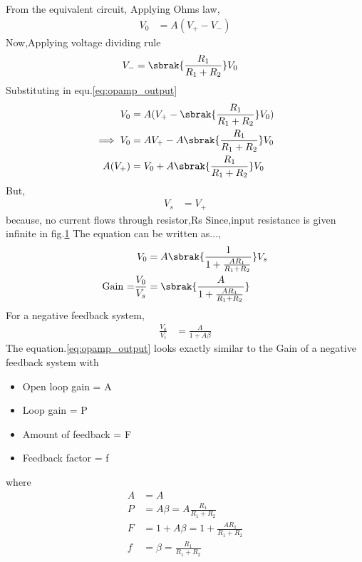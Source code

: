 \begin{enumerate}[label=\thesubsection.\arabic*.,ref=\thesubsection.\theenumi]
\begin{figure}[!ht]
\begin{center}
		\resizebox{\columnwidth}{!}{}
	\end{center}
\caption{}
\label{fig:equivalent_circuit}
\end{figure}
From the equivalent circuit,
Applying Ohms law,
\begin{align}
V_0 &= A(V_+ - V_-) \label{eq:opamp_output}
\end{align}
Now,Applying voltage dividing rule
\begin{align}
V_- &= \sbrak{\frac{R_1}{R_1+R_2}}V_0
\end{align}
Substituting in equ.\ref{eq:opamp_output}
\begin{align}
    V_0 &= A(V_+-\sbrak{\frac{R_1}{R_1+R_2}}V_0)
    \\
\implies V_0 &= AV_+-A\sbrak{\frac{R_1}{R_1+R_2}}V_0
    \\
A(V_+)&=V_0+A\sbrak{\frac{R_1}{R_1+R_2}}V_0
\end{align}
But,
\begin{align}
    V_s &= V_+
\end{align}
because, no current flows through resistor,Rs Since,input resistance is given infinite in fig.\ref{fig:equivalent_circuit} 
The equation can be written as...,
\begin{align}
    V_0 &= A\sbrak{\frac{1}{1+\frac{AR_1}{R_1+R_2}}}V_s
    \\
 \text{Gain =}\frac{V_0}{V_s}&=\sbrak{\frac{A}{1+\frac{AR_1}{R_1+R_2}}}\label{eq:opamp_gain}
\end{align}
For a negative feedback system,
\begin{align}
   \frac{V_0}{V_i} &= \frac{A}{1+A\beta}
\end{align}
The equation.\ref{eq:opamp_output} looks exactly similar to the Gain of a negative feedback system with
\begin{itemize}
    \item Open loop gain = A
    \item Loop gain = P 
    \item Amount of feedback = F
    \item Feedback factor = f
\end{itemize}
where
\begin{align}
    A &= A\\
    P &= A\beta = A\frac{R_1}{R_1+R_2}\\
    F &= 1+A\beta = 1 + \frac{AR_1}{R_1+R_2}\\
    f &= \beta = \frac{R_1}{R_1+R_2}
\end{align}

\end{enumerate}
